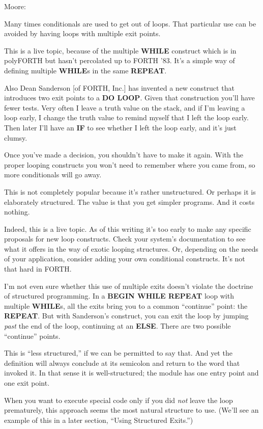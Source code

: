 \bigskip\blackline{2ex}
\noindent Moore:
\begin{tfquot}
Many times conditionals are used to get out of loops. That particular use
can be avoided by having loops with multiple exit points.

This is a live topic, because of the multiple \textbf{WHILE} construct which is in
polyFORTH but hasn't percolated up to FORTH '83. It's a simple way of
defining multiple \textbf{WHILE}s in the same \textbf{REPEAT}.

Also Dean Sanderson [of FORTH, Inc.] has invented a new construct that
introduces two exit points to a \textbf{DO LOOP}. Given that construction you'll
have fewer tests. Very often I leave a truth value on the stack, and if I'm
leaving a loop early, I change the truth value to remind myself that I left
the loop early. Then later I'll have an \textbf{IF} to see whether I left the
loop early, and it's just clumsy.

Once you've made a decision, you shouldn't have to make it again. With the
proper looping constructs you won't need to remember where you came
from, so more conditionals will go away.

This is not completely popular because it's rather unstructured. Or perhaps
it is elaborately structured. The value is that you get simpler programs.
And it costs nothing.
\end{tfquot}\blackline{1ex}
Indeed, this is a live topic. As of this writing it's too early to make any
specific proposals for new loop constructs. Check your system's
documentation to see what it offers in the way of exotic looping structures.
Or, depending on the needs of your application, consider adding
your own conditional constructs. It's not that hard in FORTH.

I'm not even sure whether this use of multiple exits doesn't violate
the doctrine of structured programming. In a \textbf{BEGIN WHILE REPEAT}
loop with multiple \textbf{WHILE}s, all the exits bring you to a common
``continue'' point: the \textbf{REPEAT}. But with Sanderson's construct, you
can exit the loop by jumping \emph{past} the end of the loop, continuing
at an \textbf{ELSE}. There are two possible ``continue'' points.

This is ``less structured,'' if we can be permitted to say that. And
yet the definition will always conclude at its semicolon and return to the
word that invoked it. In that sense it is well-structured; the module has
one entry point and one exit point.

When you want to execute special code only if you did \emph{not} leave the
loop prematurely, this approach seems the most natural structure to use.
(We'll see an example of this in a later section, ``Using Structured
Exits.'')

